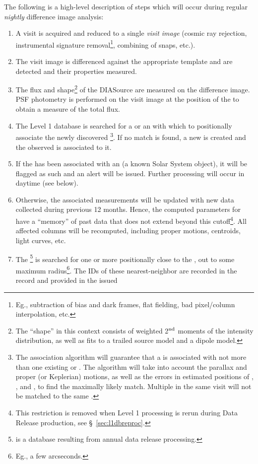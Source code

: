 The following is a high-level description of steps which will occur during regular {\em nightly} 
difference image analysis:
\begin{enumerate}
\item A visit is acquired and reduced to a single {\em visit image} (cosmic ray rejection, instrumental signature removal\footnote{Eg., subtraction of bias and dark frames, flat fielding, bad pixel/column interpolation, etc.}, combining of snaps, etc.).
\item The visit image is differenced against the appropriate template and \DIASources are detected and
their properties measured. 
\item The flux and shape\footnote{The ``shape'' in this context consists of weighted 2$^{\rm nd}$ moments
of the intensity distribution, as well as fits to a trailed source model and a dipole model.} of the DIASource are measured on the difference image. PSF photometry is performed on the visit image at the position of the \DIASource to obtain a measure of the total flux.
\item The Level 1 database is searched for a \DIAObject or an \SSObject with which to positionally associate the newly discovered \DIASource\footnote{The association algorithm will guarantee that a \DIASource is associated with not more than one existing \DIAObject or \SSObject. The algorithm will take into account the parallax and proper (or Keplerian) motions, as well as the errors in estimated positions of \DIAObject, \SSObject, and \DIASource, to find the maximally likely match. Multiple \DIASources in the same visit will not be matched to the same \DIAObject.}. If no match is found, a new \DIAObject is created and the observed \DIASource is associated to it.
\item If the \DIASource has been associated with an \SSObject (a known Solar System object), it will be flagged as such and an alert will be issued. Further processing will occur in daytime (see below).
\item Otherwise, the associated \DIAObject measurements will be updated with new data 
collected during previous 12 months. Hence, the computed parameters for \DIAObjects have a ``memory'' of past data that does not extend beyond this cutoff\footnote{This restriction is removed when Level 1 processing is
rerun during Data Release production, see \S~\ref{sec:l1dbreproc}.}. All affected columns will be recomputed, including proper motions, centroids, light curves, etc.
\item The \DR\footnote{\DR is a database resulting from annual data release processing.} is searched for one or more \Objects positionally close to the \DIAObject, out to some maximum radius\footnote{Eg., a few arcseconds.}. The IDs of these nearest-neighbor \Objects are recorded in the \DIAObject record and provided in the issued 

\end{enumerate}
